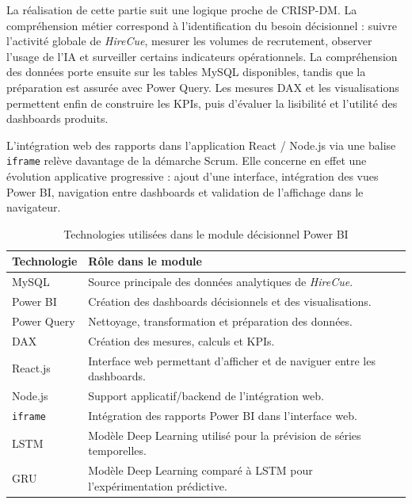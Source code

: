 La réalisation de cette partie suit une logique proche de CRISP-DM. La compréhension métier correspond à l'identification du besoin décisionnel : suivre l'activité globale de \textit{HireCue}, mesurer les volumes de recrutement, observer l'usage de l'IA et surveiller certains indicateurs opérationnels. La compréhension des données porte ensuite sur les tables MySQL disponibles, tandis que la préparation est assurée avec Power Query. Les mesures DAX et les visualisations permettent enfin de construire les KPIs, puis d'évaluer la lisibilité et l'utilité des dashboards produits.

L'intégration web des rapports dans l'application React / Node.js via une balise \texttt{iframe} relève davantage de la démarche Scrum. Elle concerne en effet une évolution applicative progressive : ajout d'une interface, intégration des vues Power BI, navigation entre dashboards et validation de l'affichage dans le navigateur.

\begin{table}[H]
\centering
\renewcommand{\arraystretch}{1.25}
\begin{tabular}{|p{3.2cm}|p{10.4cm}|}
\hline
\textbf{Technologie} & \textbf{Rôle dans le module} \\
\hline
MySQL & Source principale des données analytiques de \textit{HireCue}. \\
\hline
Power BI & Création des dashboards décisionnels et des visualisations. \\
\hline
Power Query & Nettoyage, transformation et préparation des données. \\
\hline
DAX & Création des mesures, calculs et KPIs. \\
\hline
React.js & Interface web permettant d'afficher et de naviguer entre les dashboards. \\
\hline
Node.js & Support applicatif/backend de l'intégration web. \\
\hline
\texttt{iframe} & Intégration des rapports Power BI dans l'interface web. \\
\hline
LSTM & Modèle Deep Learning utilisé pour la prévision de séries temporelles. \\
\hline
GRU & Modèle Deep Learning comparé à LSTM pour l'expérimentation prédictive. \\
\hline
\end{tabular}
\caption{Technologies utilisées dans le module décisionnel Power BI}
\label{tab:powerbi_technologies}
\end{table}

